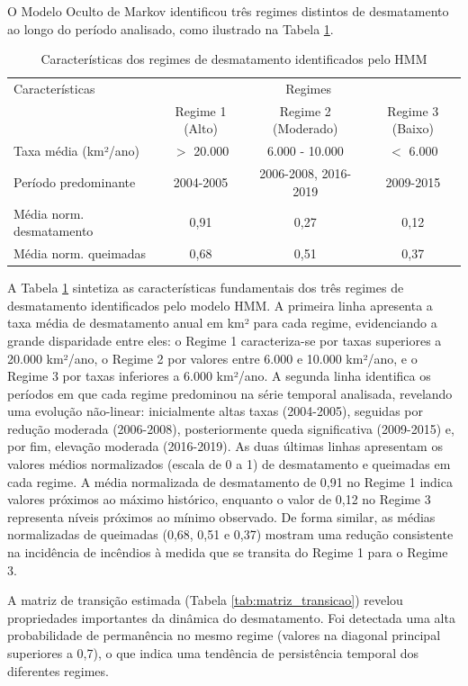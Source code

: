 \documentclass[12pt,a4paper]{article}
\begin{document}
O Modelo Oculto de Markov identificou três regimes distintos de desmatamento ao longo do período analisado, como ilustrado na Tabela \ref{tab:regimes_hmm}.

\begin{table}[htbp]
\centering
\caption{Características dos regimes de desmatamento identificados pelo HMM}
\label{tab:regimes_hmm}
\begin{tabular}{lccc}
\toprule
Características & \multicolumn{3}{c}{Regimes} \\
\cmidrule(lr){2-4}
                & Regime 1 (Alto) & Regime 2 (Moderado) & Regime 3 (Baixo) \\
\midrule
Taxa média (km²/ano)  & $>$ 20.000     & 6.000 - 10.000     & $<$ 6.000      \\
Período predominante  & 2004-2005      & 2006-2008, 2016-2019 & 2009-2015    \\
Média norm. desmatamento & 0,91        & 0,27                & 0,12          \\
Média norm. queimadas    & 0,68        & 0,51                & 0,37          \\
\bottomrule
\end{tabular}
\end{table}

A Tabela \ref{tab:regimes_hmm} sintetiza as características fundamentais dos três regimes de desmatamento identificados pelo modelo HMM. A primeira linha apresenta a taxa média de desmatamento anual em km² para cada regime, evidenciando a grande disparidade entre eles: o Regime 1 caracteriza-se por taxas superiores a 20.000 km²/ano, o Regime 2 por valores entre 6.000 e 10.000 km²/ano, e o Regime 3 por taxas inferiores a 6.000 km²/ano. A segunda linha identifica os períodos em que cada regime predominou na série temporal analisada, revelando uma evolução não-linear: inicialmente altas taxas (2004-2005), seguidas por redução moderada (2006-2008), posteriormente queda significativa (2009-2015) e, por fim, elevação moderada (2016-2019). As duas últimas linhas apresentam os valores médios normalizados (escala de 0 a 1) de desmatamento e queimadas em cada regime. A média normalizada de desmatamento de 0,91 no Regime 1 indica valores próximos ao máximo histórico, enquanto o valor de 0,12 no Regime 3 representa níveis próximos ao mínimo observado. De forma similar, as médias normalizadas de queimadas (0,68, 0,51 e 0,37) mostram uma redução consistente na incidência de incêndios à medida que se transita do Regime 1 para o Regime 3.

A matriz de transição estimada (Tabela \ref{tab:matriz_transicao}) revelou propriedades importantes da dinâmica do desmatamento. Foi detectada uma alta probabilidade de permanência no mesmo regime (valores na diagonal principal superiores a 0,7), o que indica uma tendência de persistência temporal dos diferentes regimes.
\end{document}
